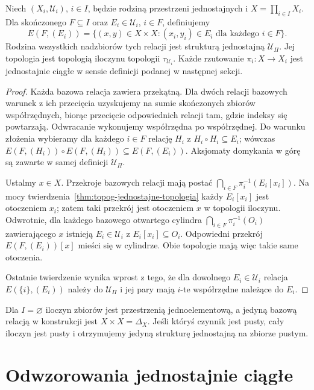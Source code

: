 \begin{twierdzenie}
\label{thm:topog-jednostajne-iloczyn}
Niech $(X_i,\mathcal U_i)$, $i\in I$, będzie
rodziną przestrzeni jednostajnych i
$X=\prod_{i\in I}X_i$. Dla skończonego
$F\subseteq I$ oraz $E_i\in\mathcal U_i$,
$i\in F$, definiujemy
\[
 E(F,(E_i))=\{(x,y)\in X\times X:
     (x_i,y_i)\in E_i\text{ dla każdego }i\in F\}.
\]
Rodzina wszystkich nadzbiorów tych relacji
jest strukturą jednostajną $\mathcal U_\Pi$.
Jej topologia jest topologią iloczynu topologii
$\tau_{\mathcal U_i}$. Każde rzutowanie
$\pi_i:X\to X_i$ jest jednostajnie ciągłe
w sensie definicji podanej w następnej sekcji.
\end{twierdzenie}
\begin{proof}
Każda bazowa relacja zawiera przekątną.
Dla dwóch relacji bazowych warunek z
ich przecięcia uzyskujemy na sumie skończonych
zbiorów współrzędnych, biorąc przecięcie
odpowiednich relacji tam, gdzie indeksy się
powtarzają. Odwracanie wykonujemy
współrzędna po współrzędnej. Do warunku
złożenia wybieramy dla każdego $i\in F$
relację $H_i$ z $H_i\circ H_i\subseteq E_i$;
wówczas
$E(F,(H_i))\circ E(F,(H_i))
\subseteq E(F,(E_i))$.
Aksjomaty domykania w górę są zawarte
w samej definicji $\mathcal U_\Pi$.

Ustalmy $x\in X$. Przekroje bazowych relacji
mają postać
$\bigcap_{i\in F}\pi_i^{-1}(E_i[x_i])$.
Na mocy twierdzenia~\ref{thm:topog-jednostajne-topologia}
każdy $E_i[x_i]$ jest otoczeniem $x_i$;
zatem taki przekrój jest otoczeniem
$x$ w topologii iloczynu. Odwrotnie,
dla każdego bazowego otwartego cylindra
$\bigcap_{i\in F}\pi_i^{-1}(O_i)$
zawierającego $x$ istnieją
$E_i\in\mathcal U_i$ z $E_i[x_i]\subseteq O_i$.
Odpowiedni przekrój $E(F,(E_i))[x]$
mieści się w cylindrze. Obie topologie
mają więc takie same otoczenia.

Ostatnie twierdzenie wynika wprost z tego,
że dla dowolnego $E_i\in\mathcal U_i$
relacja $E(\{i\},(E_i))$ należy do
$\mathcal U_\Pi$ i jej pary mają
$i$-te współrzędne należące do $E_i$.
\end{proof}

\begin{uwaga}
Dla $I=\varnothing$ iloczyn zbiorów
jest przestrzenią jednoelementową,
a jedyną bazową relacją w konstrukcji
jest $X\times X=\Delta_X$.
Jeśli któryś czynnik jest pusty,
cały iloczyn jest pusty i otrzymujemy
jedyną strukturę jednostajną na zbiorze pustym.
\end{uwaga}

\section{Odwzorowania jednostajnie ciągłe}
\label{sec:topog-jednostajne-ciaglosc}

